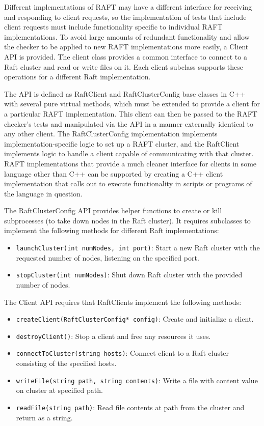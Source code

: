 \documentclass[UTF8]{article}
\begin{document}
Different implementations of RAFT may have a different interface for receiving and responding to client requests, so the implementation of tests that include client requests must include functionality specific to individual RAFT implementations. To avoid large amounts of redundant functionality and allow the checker to be applied to new RAFT implementations more easily, a Client API is provided. The client class provides a common interface to connect to a Raft cluster and read or write files on it. Each client subclass supports these operations for a different Raft implementation.

The API is defined as RaftClient and RaftClusterConfig base classes in C++ with several pure virtual methods, which must be extended to provide a client for a particular RAFT implementation. This client can then be passed to the RAFT checker's tests and manipulated via the API in a manner externally identical to any other client. The RaftClusterConfig implementation implements implementation-specific logic to set up a RAFT cluster, and the RaftClient implements logic to handle a client capable of communicating with that cluster. RAFT implementations that provide a much cleaner interface for clients in some language other than C++ can be supported by creating a C++ client implementation that calls out to execute functionality in scripts or programs of the language in question.

The RaftClusterConfig API provides helper functions to create or kill subprocesses (to take down nodes in the Raft cluster). It requires subclasses to implement the following methods for different Raft implementations:

\begin{itemize}
\item \texttt{launchCluster(int numNodes, int port)}: Start a new Raft cluster with the requested number of nodes, listening on the specified port.
\item \texttt{stopCluster(int numNodes)}: Shut down Raft cluster with the provided number of nodes.
\end{itemize}

The Client API requires that RaftClients implement the following methods:

\begin{itemize}
\item \texttt{createClient(RaftClusterConfig* config)}: Create and initialize a client.
\item \texttt{destroyClient()}: Stop a client and free any resources it uses.
\item \texttt{connectToCluster(string hosts)}: Connect client to a Raft cluster consisting of the specified hosts.
\item \texttt{writeFile(string path, string contents)}: Write a file with content value on cluster at specified path.
\item \texttt{readFile(string path)}: Read file contents at path from the cluster and return as a string.
\end{itemize}
\end{document}
